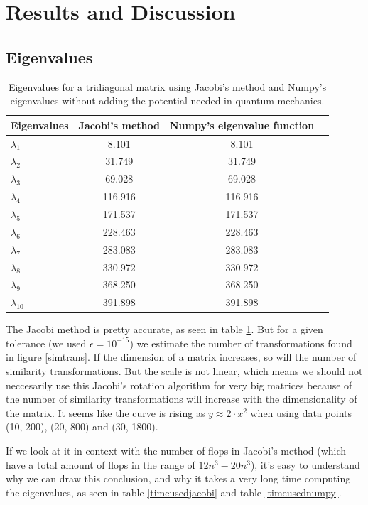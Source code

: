 \documentclass{article}
\begin{document}
\section{Results and Discussion}

\subsection{Eigenvalues}

\begin{table}[H]
    \centering
    \begin{tabular}{|l|c|c|r|}
    \hline
     Eigenvalues & Jacobi's method & Numpy's eigenvalue function\\
     \hline
      $\lambda_1$  & 8.101  & 8.101 \\
      $\lambda_2$  & 31.749  & 31.749 \\
      $\lambda_3$  & 69.028  & 69.028 \\
      $\lambda_4$  & 116.916  & 116.916 \\
      $\lambda_5$  & 171.537 & 171.537 \\
      $\lambda_6$  & 228.463  & 228.463 \\
      $\lambda_7$  & 283.083  & 283.083 \\
      $\lambda_8$  & 330.972 & 330.972 \\
      $\lambda_9$  & 368.250 & 368.250 \\
      $\lambda_{10}$ & 391.898 & 391.898 \\
      \hline
    \end{tabular}
    \caption{Eigenvalues for a tridiagonal matrix using Jacobi's method and Numpy's eigenvalues without adding the potential needed in quantum mechanics.}
    \label{eigenvalues}
\end{table}

The Jacobi method is pretty accurate, as seen in table \ref{eigenvalues}. But for a given tolerance (we used $\epsilon=10^{-15}$) we estimate the number of transformations found in figure \ref{simtrans}. If the dimension of a matrix increases, so will the number of similarity transformations.
But the scale is not linear, which means we should not neccesarily use this Jacobi's rotation algorithm for very big matrices because of the number of similarity transformations will increase with the dimensionality of the matrix. It seems like the curve is rising as $y \approx 2\cdot x^2$ when using data points (10, 200), (20, 800) and (30, 1800).

If we look at it in context with the number of flops in Jacobi's method (which have a total amount of flops in the range of $12n^3 - 20n^3$), it's easy to understand why we can draw this conclusion, and why it takes a very long time computing the eigenvalues, as seen in table \ref{timeusedjacobi} and table \ref{timeusednumpy}.
\end{document}
